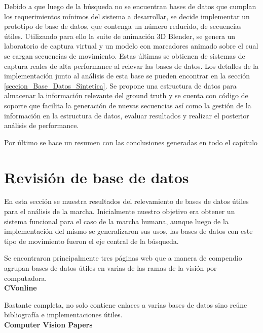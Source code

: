 Debido a que luego de la búsqueda no se encuentran bases de datos que cumplan los requerimientos mínimos del sistema a desarrollar, se decide implementar un prototipo de base de datos, que contenga un número reducido, de secuencias útiles. Utilizando para ello la suite de animación 3D Blender, se genera un laboratorio de captura virtual y un modelo con marcadores animado sobre el cual se cargan secuencias de movimiento. Estas últimas se obtienen de sistemas de captura reales de alta performance al relevar las bases de datos. Los detalles de la implementación junto al análisis de esta base se pueden encontrar en la sección \ref{seccion_Base_Datos_Sintetica}.  
Se propone una estructura de datos para almacenar la información relevante del ground truth y  se cuenta con código de soporte que facilita la generación de nuevas secuencias así como la gestión de la información en la estructura de datos, evaluar resultados y realizar el  posterior análisis de performance.

Por último se hace un resumen con las conclusiones generadas en todo el capítulo

\section{Revisión de base de datos}
\label{seccion_revision_base_datos}
En esta sección se muestra  resultados del relevamiento de bases de datos útiles para el análisis de la marcha.
Inicialmente nuestro objetivo era obtener un sistema funcional para el caso de la marcha humana, aunque luego de la implementación del mismo se generalizaron sus usos, las bases de datos con este tipo de movimiento fueron el eje central de la búsqueda.

Se encontraron principalmente tres páginas web que a manera de compendio agrupan  bases de datos útiles en varias de las ramas de la visión por computadora.\\

\hspace{-0.7cm} \textbf{CVonline \cite{CVonline}} %

Bastante completa, no solo contiene enlaces a  varias bases de datos sino reúne bibliografía e implementaciones útiles.\\


\hspace{-0.7cm} \textbf{Computer Vision Papers \cite{CVPapers}}  %

